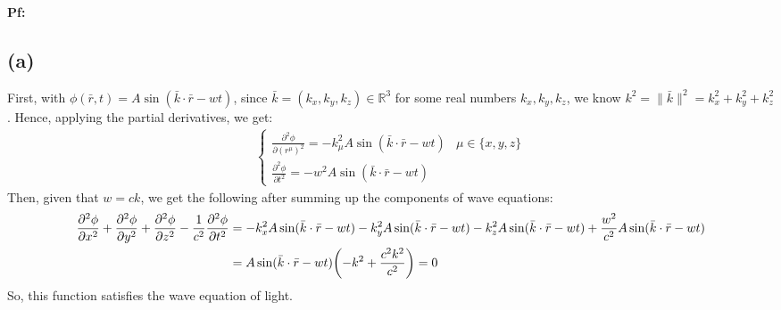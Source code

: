 \documentclass{article}
\newcommand{\RR}{\mathbb{R}}
\DeclarePairedDelimiter{\paran}{(}{)}%
\begin{document}
\textbf{Pf:}
\subsection*{(a)}
First, with $\phi(\bar{r},t)=A\sin(\bar{k}\cdot \bar{r}-wt)$, since $\bar{k}=(k_x,k_y,k_z)\in\RR^3$ for some real numbers $k_x,k_y,k_z$, we know $k^2=\|\bar{k}\|^2 =k_x^2+k_y^2+k_z^2$. Hence, applying the partial derivatives, we get:
\begin{align}
    \begin{cases}
        \frac{\partial^2 \phi}{\partial (r^\mu)^2} = -k_\mu^2 A\sin(\bar{k}\cdot \bar{r}-wt) & \mu \in \{x,y,z\}\\
        \frac{\partial ^2\phi}{\partial t^2}=-w^2 A\sin(\bar{k}\cdot \bar{r}-wt)
    \end{cases}
\end{align}
Then, given that $w = ck$, we get the following after summing up the components of wave equations:
\begin{align}
    \frac{\partial^2\phi}{\partial x^2}+\frac{\partial^2\phi}{\partial y^2}+\frac{\partial^2\phi}{\partial z^2}-\frac{1}{c^2}\frac{\partial^2\phi}{\partial t^2} &= -k_x^2A\sin(\bar{k}\cdot \bar{r}-wt) -k_y^2A\sin(\bar{k}\cdot \bar{r}-wt)-k_z^2A\sin(\bar{k}\cdot \bar{r}-wt)+\frac{w^2}{c^2}A\sin(\bar{k}\cdot \bar{r}-wt)\\
    &= A\sin(\bar{k}\cdot \bar{r}-wt)\paran*{ -k^2 + \frac{c^2k^2}{c^2}} = 0
\end{align}
So, this function satisfies the wave equation of light.
\end{document}
